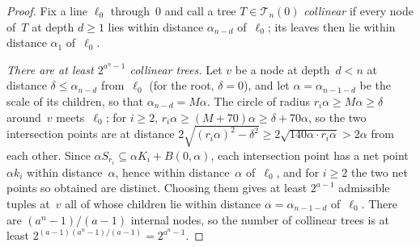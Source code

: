 \documentclass[11pt,letterpaper]{article}
\begin{document}
\begin{proof}
Fix a line $\ell_0$ through~$0$ and call a tree $T\in\mathcal T_n(0)$ \emph{collinear} if every node of~$T$ at depth $d\ge1$ lies within distance $\alpha_{n-d}$ of~$\ell_0$; its leaves then lie within distance $\alpha_1$ of~$\ell_0$.

\emph{There are at least $2^{a^n-1}$ collinear trees.} Let $v$ be a node at depth~$d<n$ at distance $\delta\le\alpha_{n-d}$ from~$\ell_0$ (for the root, $\delta=0$), and let $\alpha=\alpha_{n-1-d}$ be the scale of its children, so that $\alpha_{n-d}=M\alpha$. The circle of radius $r_i\alpha\ge M\alpha\ge\delta$ around~$v$ meets~$\ell_0$; for $i\ge2$, $r_i\alpha\ge(M+70)\alpha\ge\delta+70\alpha$, so the two intersection points are at distance $2\sqrt{(r_i\alpha)^2-\delta^2}\ge2\sqrt{140\alpha\cdot r_i\alpha}>2\alpha$ from each other. Since $\alpha S_{r_i}\subseteq\alpha K_i+B(0,\alpha)$, each intersection point has a net point $\alpha k_i$ within distance~$\alpha$, hence within distance~$\alpha$ of~$\ell_0$, and for $i\ge2$ the two net points so obtained are distinct. Choosing them gives at least $2^{a-1}$ admissible tuples at~$v$ all of whose children lie within distance $\alpha=\alpha_{n-1-d}$ of~$\ell_0$. There are $(a^n-1)/(a-1)$ internal nodes, so the number of collinear trees is at least $2^{(a-1)(a^n-1)/(a-1)}=2^{a^n-1}$.


\end{proof}
\end{document}
